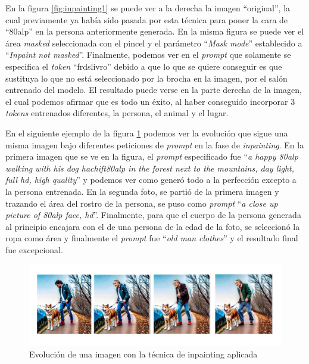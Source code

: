 En la figura \ref{fig:inpainting1} se puede ver a la derecha la imagen ``original'', la cual previamente ya había sido pasada por esta técnica para poner la cara de ``80alp'' en la persona anteriormente generada. En la misma figura se puede ver el área \textit{masked} seleccionada con el pincel y el parámetro ``\textit{Mask mode}'' establecido a ``\textit{Inpaint not masked}''. Finalmente, podemos ver en el \textit{prompt} que solamente se especifica el \textit{token} ``frdslivro'' debido a que lo que se quiere conseguir es que sustituya lo que no está seleccionado por la brocha en la imagen, por el salón entrenado del modelo. El resultado puede verse en la parte derecha de la imagen, el cual podemos afirmar que es todo un éxito, al haber conseguido incorporar 3 \textit{tokens} entrenados diferentes, la persona, el animal y el lugar. 

En el siguiente ejemplo de la figura \ref{fig:fasesinpainting} podemos ver la evolución que sigue una misma imagen bajo diferentes peticiones de \textit{prompt} en la fase de \textit{inpainting}. En la primera imagen que se ve en la figura, el \textit{prompt} especificado fue ``\textit{a happy 80alp walking with his dog hachift80alp in the forest next to the mountains, day light, full hd, high quality}'' y podemos ver como generó todo a la perfección excepto a la persona entrenada. En la segunda foto, se partió de la primera imagen y trazando el área del rostro de la persona, se puso como \textit{prompt} ``\textit{a close up picture of 80alp face, hd}''. Finalmente, para que el cuerpo de la persona generada al principio encajara con el de una persona de la edad de la foto, se seleccionó la ropa como área y finalmente el \textit{prompt} fue ``\textit{old man clothes}'' y el resultado final fue excepcional. 

\begin{figure}[h]
	\centering
	\includegraphics[width = 1.1
	\textwidth]{Imagenes/Vectorial/fasesinpainting.png}
	\caption{Evolución de una imagen con la técnica de inpainting aplicada}
	\label{fig:fasesinpainting}
\end{figure}

